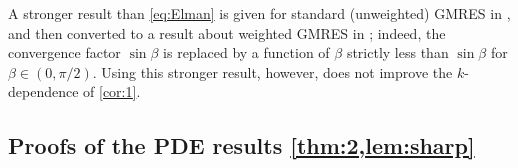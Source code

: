 A stronger result than \cref{eq:Elman} is given for standard (unweighted) GMRES in \cite[Theorem 2.1]{BeGoTy:06}, and then converted to a result about weighted GMRES in \cite[Theorem 5.3]{BoDoGrSpTo:19}; indeed, the convergence factor $\sin \beta$ is replaced by a function of $\beta$ strictly less than $\sin\beta$ for $\beta\in (0,\pi/2)$. Using this stronger result, however, does not improve the $k$-dependence of \cref{cor:1}.
\ere



\subsection{Proofs of the PDE results \cref{thm:2,lem:sharp}}\label{sec:pdeproofs}

